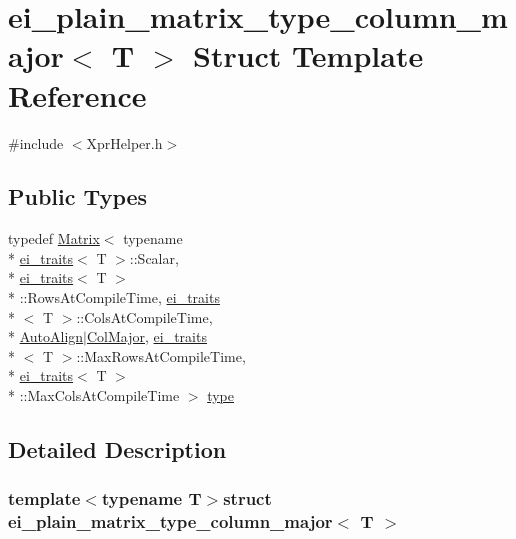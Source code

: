 \hypertarget{structei__plain__matrix__type__column__major}{\section{ei\-\_\-plain\-\_\-matrix\-\_\-type\-\_\-column\-\_\-major$<$ T $>$ Struct Template Reference}
\label{structei__plain__matrix__type__column__major}
}


{\ttfamily \#include $<$Xpr\-Helper.\-h$>$}

\subsection*{Public Types}
\begin{DoxyCompactItemize}
\item 
typedef \hyperlink{class_matrix}{Matrix}$<$ typename \\*
\hyperlink{structei__traits}{ei\-\_\-traits}$<$ T $>$\-::Scalar, \\*
\hyperlink{structei__traits}{ei\-\_\-traits}$<$ T $>$\\*
\-::Rows\-At\-Compile\-Time, \hyperlink{structei__traits}{ei\-\_\-traits}\\*
$<$ T $>$\-::Cols\-At\-Compile\-Time, \\*
\hyperlink{_constants_8h_a4d29ca5db06e2ae647d1ec22548a9d2aa02a97bb4792f98916a1156a521fa9813}{Auto\-Align}$|$\hyperlink{_constants_8h_a4d29ca5db06e2ae647d1ec22548a9d2aac86184b0e3be936fbfd20249a057a0bf}{Col\-Major}, \hyperlink{structei__traits}{ei\-\_\-traits}\\*
$<$ T $>$\-::Max\-Rows\-At\-Compile\-Time, \\*
\hyperlink{structei__traits}{ei\-\_\-traits}$<$ T $>$\\*
\-::Max\-Cols\-At\-Compile\-Time $>$ \hyperlink{structei__plain__matrix__type__column__major_a038c0b348f1d8849036cbd2bfe8bba6b}{type}
\end{DoxyCompactItemize}


\subsection{Detailed Description}
\subsubsection*{template$<$typename T$>$struct ei\-\_\-plain\-\_\-matrix\-\_\-type\-\_\-column\-\_\-major$<$ T $>$}



